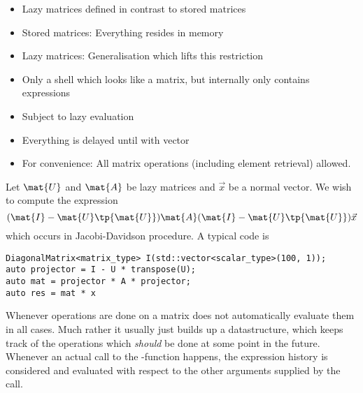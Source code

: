 \begin{itemize}
	\item Lazy matrices defined in contrast to stored matrices
	\item Stored matrices: Everything resides in memory
	\item Lazy matrices: Generalisation which lifts this restriction
	\item Only a shell which looks like a matrix, but internally only contains expressions
	\item Subject to lazy evaluation
	\item Everything is delayed until \contraction with vector
	\item For convenience: All matrix operations (including element retrieval) allowed.
\end{itemize}

Let $\mat{U}$ and $\mat{A}$ be lazy matrices and $\vec{x}$ be a normal vector.
We wish to compute the expression
\[ (\mat{I} - \mat{U} \tp{\mat{U}}) \mat{A} (\mat{I} - \mat{U} \tp{\mat{U}}) \vec{x} \]
which occurs in Jacobi-Davidson procedure.
A typical code is
\begin{lstlisting}
DiagonalMatrix<matrix_type> I(std::vector<scalar_type>(100, 1));
auto projector = I - U * transpose(U);
auto mat = projector * A * projector;
auto res = mat * x
\end{lstlisting}




\label{sec:lazymat}

Whenever operations are done on a matrix \lazyten does not automatically
evaluate them in all cases.
Much rather it usually just builds up a datastructure,
which keeps track of the operations which \textit{should} be done
at some point in the future.
Whenever an actual call to the \contraction-function happens,
the expression history is considered and evaluated with respect
to the other arguments supplied by the \contraction call.



